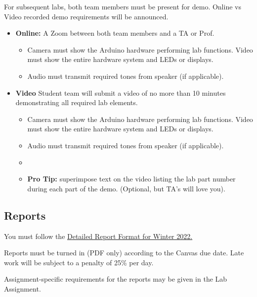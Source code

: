 For subsequent labs, both team members must be present for demo.  
Online vs Video recorded demo requirements will be announced.
\begin{itemize}
\item {\bf Online: }  A Zoom between both team members and a TA or Prof.  
    \begin{itemize}
        \item Camera must show the Arduino hardware performing lab functions. Video must show the entire hardware system and LEDs or displays.
        \item Audio must transmit required tones from speaker (if applicable). 
    \end{itemize}
\item {\bf Video} Student team will submit a video of no more than 10 minutes
demonstrating all required lab elements. 
    \begin{itemize}
        \item Camera must show the Arduino hardware performing lab functions. Video must show the entire hardware system and LEDs or displays.
        \item Audio must transmit required tones from speaker (if applicable).
        \item 
        \item {\bf Pro Tip:} superimpose text on the video listing the lab part
        number during each part of the demo.  (Optional, but TA's will love you).
    \end{itemize}
\end{itemize}


    
\subsection{Reports}

You must follow the 
\href{https://docs.google.com/document/d/1ULLzhaaIIeD6ySu6mXbT2wZu7wzkd9dZKkvZofGXWs8/edit#heading=h.kn22uqjivvbw}
{Detailed Report Format for Winter 2022.}

Reports must be turned in (PDF only) according to the Canvas due date.
Late work will be subject to a penalty of 25\% per day. 

Assignment-specific requirements for the reports may be given in the Lab Assignment.

